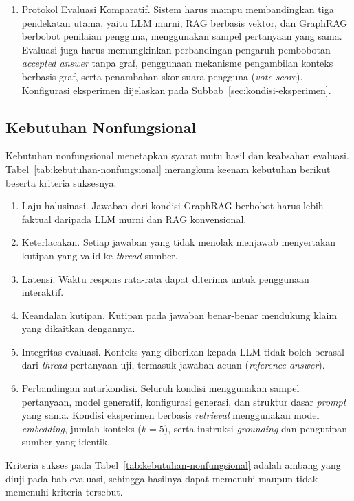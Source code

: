 \begin{enumerate}[label=\textbf{F\arabic*.}]
    \item Protokol Evaluasi Komparatif.
    Sistem harus mampu membandingkan tiga pendekatan utama, yaitu LLM murni, RAG berbasis vektor, dan GraphRAG berbobot penilaian pengguna, menggunakan sampel pertanyaan yang sama. Evaluasi juga harus memungkinkan perbandingan pengaruh pembobotan \emph{accepted answer} tanpa graf, penggunaan mekanisme pengambilan konteks berbasis graf, serta penambahan skor suara pengguna (\emph{vote score}). Konfigurasi eksperimen dijelaskan pada Subbab~\ref{sec:kondisi-eksperimen}.
\end{enumerate}

\subsection{Kebutuhan Nonfungsional}
\label{subsec:kebutuhan-nonfungsional}

Kebutuhan nonfungsional menetapkan syarat mutu hasil dan keabsahan evaluasi. Tabel~\ref{tab:kebutuhan-nonfungsional} merangkum keenam kebutuhan berikut beserta kriteria suksesnya.
\begin{enumerate}[label=\textbf{NF\arabic*.}]
    \item Laju halusinasi. Jawaban dari kondisi GraphRAG berbobot harus lebih faktual daripada LLM murni dan RAG konvensional.
    \item Keterlacakan. Setiap jawaban yang tidak menolak menjawab menyertakan kutipan yang valid ke \emph{thread} sumber.
    \item Latensi. Waktu respons rata-rata dapat diterima untuk penggunaan interaktif.
    \item Keandalan kutipan. Kutipan pada jawaban benar-benar mendukung klaim yang dikaitkan dengannya.
    \item Integritas evaluasi. Konteks yang diberikan kepada LLM tidak boleh berasal dari \emph{thread} pertanyaan uji, termasuk jawaban acuan (\emph{reference answer}).
    \item Perbandingan antarkondisi. Seluruh kondisi menggunakan sampel pertanyaan, model generatif, konfigurasi generasi, dan struktur dasar \emph{prompt} yang sama. Kondisi eksperimen berbasis \emph{retrieval} menggunakan model \emph{embedding}, jumlah konteks ($k=5$), serta instruksi \emph{grounding} dan pengutipan sumber yang identik.
\end{enumerate}

Kriteria sukses pada Tabel~\ref{tab:kebutuhan-nonfungsional} adalah ambang yang diuji pada bab evaluasi, sehingga hasilnya dapat memenuhi maupun tidak memenuhi kriteria tersebut.


